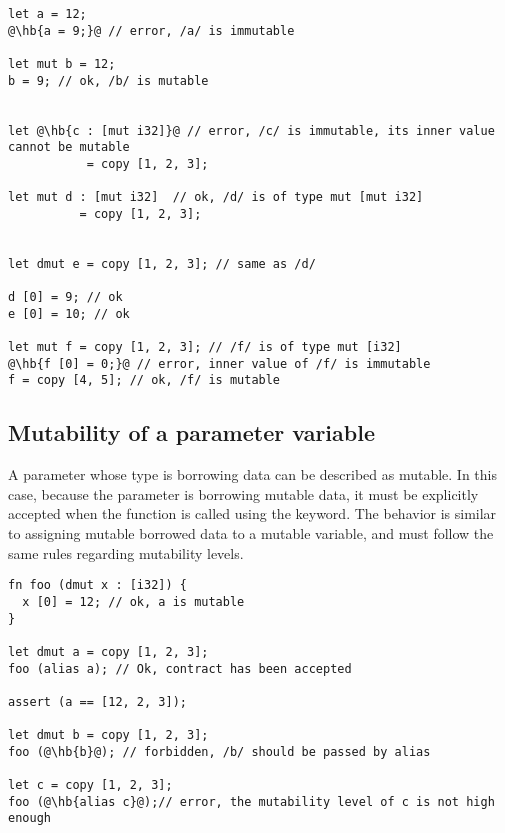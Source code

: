 \begin{lstlisting}[style=coloredverbatim, escapechar=@]
let a = 12;
@\hb{a = 9;}@ // error, /a/ is immutable

let mut b = 12;
b = 9; // ok, /b/ is mutable


let @\hb{c : [mut i32]}@ // error, /c/ is immutable, its inner value cannot be mutable
           = copy [1, 2, 3];

let mut d : [mut i32]  // ok, /d/ is of type mut [mut i32]
          = copy [1, 2, 3];


let dmut e = copy [1, 2, 3]; // same as /d/

d [0] = 9; // ok
e [0] = 10; // ok

let mut f = copy [1, 2, 3]; // /f/ is of type mut [i32]
@\hb{f [0] = 0;}@ // error, inner value of /f/ is immutable
f = copy [4, 5]; // ok, /f/ is mutable
\end{lstlisting}


\subsection{Mutability of a parameter variable}

A parameter whose type is borrowing data can be described as mutable. In this
case, because the parameter is borrowing mutable data, it must be explicitly
accepted when the function is called using the  keyword. The
behavior is similar to assigning mutable borrowed data to a mutable variable,
and must follow the same rules regarding mutability levels.

\begin{lstlisting}[style=coloredverbatim, escapechar=@]
fn foo (dmut x : [i32]) {
  x [0] = 12; // ok, a is mutable
}

let dmut a = copy [1, 2, 3];
foo (alias a); // Ok, contract has been accepted

assert (a == [12, 2, 3]);

let dmut b = copy [1, 2, 3];
foo (@\hb{b}@); // forbidden, /b/ should be passed by alias

let c = copy [1, 2, 3];
foo (@\hb{alias c}@);// error, the mutability level of c is not high enough
\end{lstlisting}


